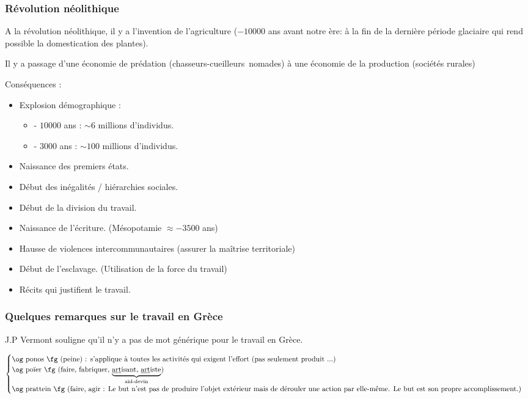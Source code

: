 \documentclass[a4paper, 11pt, hidelinks]{article}
\begin{document}
\subsubsection{Révolution néolithique}

A la révolution néolithique, il y a l'invention de l'agriculture ($-10 000$ ans avant notre ère: à la fin de la dernière 
période glaciaire qui rend possible la domestication des plantes).


Il y a passage d'une économie de prédation (\og chasseurs-cueilleurs \fg nomades) à une économie de la production (sociétés rurales)


Conséquences : 
\begin{itemize}
    \item Explosion démographique : 
    \begin{itemize}
        \item - $10000$ ans : $\sim 6$ millions d'individus.
        \item - $3000$ ans : $\sim 100$ millions d'individus.
    \end{itemize}
    \item Naissance des premiers états.
    \item Début des inégalités / hiérarchies sociales.
    \item Début de la division du travail.
    \item Naissance de l'écriture. (Mésopotamie $\approx -3500$ ans)
    \item Hausse de violences intercommunautaires (assurer la maîtrise territoriale)
    \item Début de l'esclavage. (Utilisation de la force du travail)
    \item Récits qui justifient le travail.
\end{itemize}


\subsubsection{Quelques remarques sur le travail en Grèce}

J.P Vermont souligne qu'il n'y a pas de mot \og générique \fg pour le travail en Grèce.




$\begin{cases}
    \text{\og ponos \fg (peine) : s'applique à toutes les activités qui exigent l'effort (pas seulement produit ...)} \\
    \text{\og poïer \fg (faire, fabriquer, $\underbrace{\text{\underline{art}isant, \underline{art}iste}}_{\text{aïd-devin}}$)} \\
    \text{\og prattein \fg (faire, agir : Le but n'est pas de produire l'objet extérieur mais de dérouler une action par 
    elle-même. Le but est son propre accomplissement.)}
\end{cases}$
\end{document}
